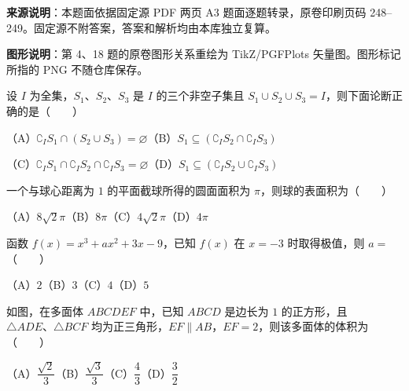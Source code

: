 


\begin{gktip}
\textbf{来源说明}：本题面依据固定源 PDF 两页 A3 题面逐题转录，原卷印刷页码 248–249。固定源不附答案，答案和解析均由本库独立复算。

\textbf{图形说明}：第 4、18 题的原卷图形关系重绘为 TikZ/PGFPlots 矢量图。图形标记所指的 PNG 不随仓库保存。
\end{gktip}


\begin{question}
设 $I$ 为全集，$S_1\text{、}S_2\text{、}S_3$ 是 $I$ 的三个非空子集且 $S_1\cup S_2\cup S_3=I$，则下面论断正确的是\mbox{（　　）}

（A）$\complement_I S_1\cap(S_2\cup S_3)=\varnothing$\quad（B）$S_1\subseteq(\complement_I S_2\cap\complement_I S_3)$

（C）$\complement_I S_1\cap\complement_I S_2\cap\complement_I S_3=\varnothing$\quad（D）$S_1\subseteq(\complement_I S_2\cup\complement_I S_3)$

\end{question}
\begin{question}
一个与球心距离为 $1$ 的平面截球所得的圆面面积为 $\pi$，则球的表面积为\mbox{（　　）}

（A）$8\sqrt2\pi$\quad（B）$8\pi$\quad（C）$4\sqrt2\pi$\quad（D）$4\pi$

\end{question}
\begin{question}
函数 $f(x)=x^3+ax^2+3x-9$，已知 $f(x)$ 在 $x=-3$ 时取得极值，则 $a=$\mbox{（　　）}

（A）$2$\quad（B）$3$\quad（C）$4$\quad（D）$5$

\Needspace{0.4\textheight}
\end{question}
\begin{question}
如图，在多面体 $ABCDEF$ 中，已知 $ABCD$ 是边长为 $1$ 的正方形，且 $\triangle ADE\text{、}\triangle BCF$ 均为正三角形，$EF\parallel AB$，$EF=2$，则该多面体的体积为\mbox{（　　）}
\nopagebreak[4]
\begin{center}\end{center}
\nopagebreak[4]
（A）$\dfrac{\sqrt2}{3}$\quad（B）$\dfrac{\sqrt3}{3}$\quad（C）$\dfrac43$\quad（D）$\dfrac32$

\end{question}

